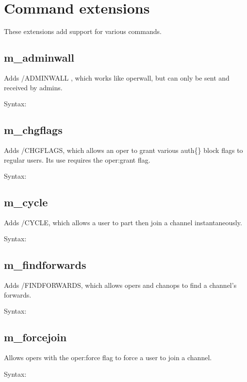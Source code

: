 \section{Command extensions}
\label{cmdextensions}

	These extensions add support for various commands.

\subsection{m\_adminwall}

	Adds /ADMINWALL , which works like operwall, but can only be sent and
	received by admins.

	Syntax:  

\subsection{m\_chgflags}

	Adds /CHGFLAGS, which allows an oper to grant various auth\{\} block flags
	to regular users.  Its use requires the oper:grant flag.

	Syntax:   

\subsection{m\_cycle}

	Adds /CYCLE, which allows a user to part then join a channel instantaneously.

	Syntax:  

\subsection{m\_findforwards}

	Adds /FINDFORWARDS, which allows opers and chanops to find a channel's forwards.

	Syntax:  

\subsection{m\_forcejoin}

	Allows opers with the oper:force flag to force a user to join a channel.

	Syntax:   


